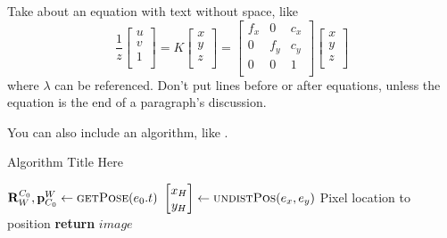 Take about an equation with text without space, like
\begin{equation}
\label{eq:eqRefNameHere}
\frac{1}{z}
\begin{bmatrix}
u \\
v \\
1 \\
\end{bmatrix}=
K \begin{bmatrix}
x \\
y \\
z \\
\end{bmatrix}=
\begin{bmatrix}
f_x & 0 & c_x \\
0 & f_y & c_y \\
0 & 0 & 1 \\
\end{bmatrix}
\begin{bmatrix}
x \\
y \\
z \\
\end{bmatrix}
\end{equation}
where $\lambda$ can be referenced. Don't put lines before or after equations, unless the equation is the end of a paragraph's discussion.

You can also include an algorithm, like .

\begin{algorithm}[tb!]
	\caption{Algorithm Title Here}
	\label{alg:algorithmRefName}
	\begin{algorithmic}[1] %
		\State $\mathbf{R}^{C_0}_W,\mathbf{p}^W_{C_0} \gets \textsc{getPose}(e_0.t)$	
		 
		\State $\begin{bmatrix}x_H \\ y_H \end{bmatrix}  \gets \textsc{undistPos}(e_x,e_y)$ \Comment Pixel location to position
		\label{alg:line:lineRefName} %
		\EndFor
		\State \textbf{return} $image$
		\EndFunction
	\end{algorithmic}
\end{algorithm}
